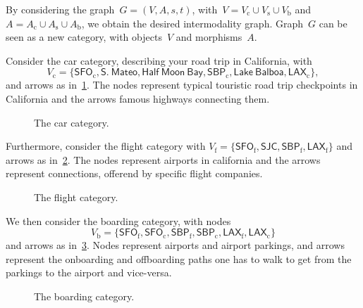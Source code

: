 By considering the graph~$G=(V,A,s,t)$, with~$V=V_\mathrm{c}\cup V_\mathrm{s}\cup V_\mathrm{b}$ and~$A=A_\mathrm{c}\cup A_\mathrm{s}\cup A_\mathrm{b}$, we obtain the desired intermodality graph. Graph~$G$ can be seen as a new category, with objects~$V$ and morphisms~$A$.
\begin{example}
Consider the car category, describing your road trip in California, with
\begin{equation*}
    V_\mathrm{c}=\{\mathsf{SFO}_\mathrm{c},\mathsf{S.}\ \mathsf{Mateo},\mathsf{Half} \ \mathsf{Moon}\ \mathsf{Bay},\mathsf{SBP}_\mathrm{c},\mathsf{Lake}\ \mathsf{Balboa},\mathsf{LAX}_\mathrm{c}\},
\end{equation*}
and arrows as in~\cref{fig:carcat}. The nodes represent typical touristic road trip checkpoints in California and the arrows famous highways connecting them.

\begin{figure}[h!]
\begin{center}
\end{center}
\caption{The car category. \label{fig:carcat}}
\end{figure}

Furthermore, consider the flight category with $V_\mathrm{f}=\{\mathsf{SFO}_\mathrm{f},\mathsf{SJC},\mathsf{SBP}_\mathrm{f},\mathsf{LAX}_\mathrm{f}\}$ and arrows as in~\cref{fig:flight}. The nodes represent airports in california and the arrows represent connections, offerend by specific flight companies.

\begin{figure}[h!]
\begin{center}
\end{center}
\caption{The flight category. \label{fig:flight}}
\end{figure}

We then consider the boarding category, with nodes
\begin{equation*}
    V_\mathrm{b}=\{\mathsf{SFO}_\mathrm{f},\mathsf{SFO}_\mathrm{c},\mathsf{SBP}_\mathrm{f},\mathsf{SBP}_\mathrm{c},\mathsf{LAX}_\mathrm{f},\mathsf{LAX}_\mathrm{c}\}
\end{equation*}
and arrows as in~\cref{fig:boarding}. Nodes represent airports and airport parkings, and arrows represent the onboarding and offboarding paths one has to walk to get from the parkings to the airport and vice-versa.

\begin{figure}[h!]
\begin{center}
\end{center}
\caption{The boarding category. \label{fig:boarding}}
\end{figure}


\end{example}
